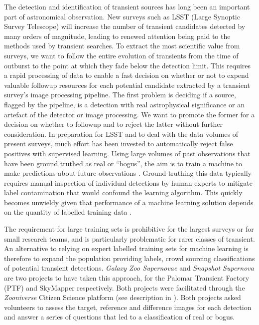 \message{ !name(blank.tex)}\documentclass[a4paper,fleqn,usenatbib]{mnras}
\begin{document}
The detection and identification of transient sources has long been an important part of astronomical observation. New surveys such as LSST (Large Synoptic Survey Telescope)\citep{Ivezic08} will increase the number of transient candidates detected by many orders of magnitude, leading to renewed attention being paid to the methods used by transient searches.  To extract the most scientific value from surveys, we want to follow the entire evolution of transients from the time of outburst to the point at which they fade below the detection limit.  This requires a rapid processing of data to enable a fast decision on whether or not to expend valuable followup resources for each potential candidate extracted by a transient survey's image processing pipeline.  The first problem is deciding if a source, flagged by the pipeline, is a detection with real astrophysical significance or an artefact of the detector or image processing.  We want to promote the former for a decision on whether to followup  and to reject the latter without further consideration.  In preparation for LSST and to deal with the data volumes of present surveys, much effort has been invested to automatically reject false positives with supervised learning. Using large volumes of past observations that have been ground truthed as real or ``bogus'', the aim is to train a machine to make predictions about future observations \citep{Bloom12, Brink13, Goldstein15, duBuisson15, Donalek08, Romano06, Bailey07}.  Ground-truthing this data typically requires manual inspection of individual detections by human experts to mitigate label contamination that would confound the learning algorithm.  This quickly becomes unwieldy given that performance of a machine learning solution depends on the quantity of labelled training data \citep{Banko01}.



The requirement for large training sets is prohibitive for the largest surveys or for small research teams, and is particularly problematic for rarer classes of transient.  An alternative to relying on expert labelled training sets for machine learning is therefore to expand the population providing labels, crowd sourcing classifications of potential transient detections.  \textit{Galaxy Zoo Supernovae} \citep{Smith11} and \textit{Snapshot Supernova} \citep{Campbell15} are two projects to have taken this approach, for the Palomar Transient Factory (PTF) \citep{Rau09, Law09} and SkyMapper \citep{Keller07} respectively.  Both projects were facilitated through the \textit{Zooniverse} Citizen Science platform (see description in \citet{Marshall16}).  Both projects asked volunteers to assess the target, reference and difference images for each detection and answer a series of questions that led to a classification of real or bogus.  
\end{document}
